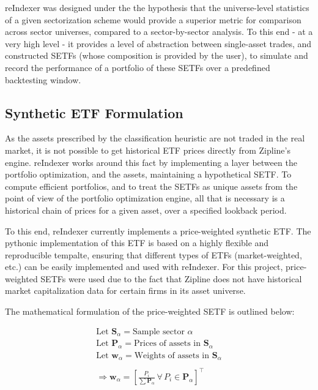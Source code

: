 \documentclass[../main.tex]{subfiles}
\begin{document}
reIndexer was designed under the the hypothesis that the universe-level statistics of a given sectorization scheme would provide a superior metric for comparison across sector universes, compared to a sector-by-sector analysis. To this end - at a very high level - it provides a level of abstraction between single-asset trades, and constructed SETFs (whose composition is provided by the user), to simulate and record the performance of a portfolio of these SETFs over a predefined backtesting window.

\subsection{Synthetic ETF Formulation}

As the assets prescribed by the classification heuristic are not traded in the real market, it is not possible to get historical ETF prices directly from Zipline's engine. reIndexer works around this fact by implementing a layer between the portfolio optimization, and the assets, maintaining a hypothetical SETF. To compute efficient portfolios, and to treat the SETFs as unique assets from the point of view of the portfolio optimization engine, all that is necessary is a historical chain of prices for a given asset, over a specified lookback period.

To this end, reIndexer currently implements a price-weighted synthetic ETF. The pythonic implementation of this ETF is based on a highly flexible and reproducible tempalte, ensuring that different types of ETFs (market-weighted, etc.) can be easily implemented and used with reIndexer. For this project, price-weighted SETFs were used due to the fact that Zipline does not have historical market capitalization data for certain firms in its asset universe.

The mathematical formulation of the price-weighted SETF is outlined below:

\begin{gather*}
    \text{Let $\boldsymbol{S}_\alpha$} = \text{Sample sector $\alpha$} \\
    \text{Let $\boldsymbol{P}_\alpha$} = \text{Prices of assets in $\boldsymbol{S}_\alpha$} \\
    \text{Let $\boldsymbol{w}_\alpha$} = \text{Weights of assets in $\boldsymbol{S}_\alpha$} \\
    \\
    \Rightarrow \boldsymbol{w}_\alpha = \left[ \frac{P_i}{\sum \boldsymbol{P}_\alpha} \, \forall \, P_i \in \boldsymbol{P}_\alpha \right]^\intercal
\end{gather*}
\end{document}
